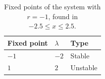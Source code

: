 \begin{table}
\centering
\caption{Fixed points of the system with $r = -1$, found in $-2.5 \le x \le 2.5$.}
\label{tab:saddle-node-bifurcation-fixed-points}
\begin{tabular}{@{}lll@{}}
\toprule
Fixed point & $\lambda$ & Type \\
\midrule
$\num{-1}$ & $\num{-2}$ & Stable \\
$\num{1}$ & $\num{2}$ & Unstable \\
\bottomrule
\end{tabular}
\end{table}
